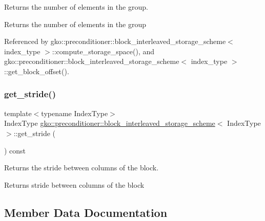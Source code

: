Returns the number of elements in the group. 

\begin{DoxyReturn}{Returns}
the number of elements in the group 
\end{DoxyReturn}


Referenced by gko\+::preconditioner\+::block\+\_\+interleaved\+\_\+storage\+\_\+scheme$<$ index\+\_\+type $>$\+::compute\+\_\+storage\+\_\+space(), and gko\+::preconditioner\+::block\+\_\+interleaved\+\_\+storage\+\_\+scheme$<$ index\+\_\+type $>$\+::get\+\_\+block\+\_\+offset().

\mbox{\label{structgko_1_1preconditioner_1_1block__interleaved__storage__scheme_aa07119fbf99fae71b1f9c4f693e14ce4}} 
\subsubsection{\texorpdfstring{get\+\_\+stride()}{get\_stride()}}
{\footnotesize\ttfamily template$<$typename Index\+Type$>$ \\
Index\+Type \hyperlink{structgko_1_1preconditioner_1_1block__interleaved__storage__scheme}{gko\+::preconditioner\+::block\+\_\+interleaved\+\_\+storage\+\_\+scheme}$<$ Index\+Type $>$\+::get\+\_\+stride (\begin{DoxyParamCaption}{ }\end{DoxyParamCaption}) const\hspace{0.3cm}{\ttfamily [noexcept]}}



Returns the stride between columns of the block. 

\begin{DoxyReturn}{Returns}
stride between columns of the block 
\end{DoxyReturn}


\subsection{Member Data Documentation}
\mbox{\label{structgko_1_1preconditioner_1_1block__interleaved__storage__scheme_a8fa279f4178c767bdbf52ef4d7e23ad1}} 
